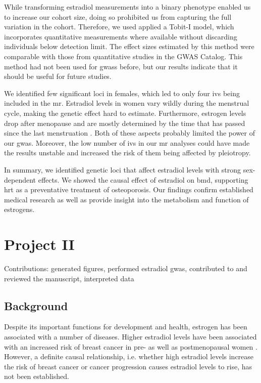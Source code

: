 \documentclass[twoside=false]{scrbook}
\begin{document}
While transforming estradiol measurements into a binary phenotype enabled us to increase our cohort size, doing so prohibited us from capturing the full variation in the cohort.
Therefore, we used applied a Tobit-I model, which incorporates quantitative measurements where available without discarding individuals below detection limit.
The effect sizes estimated by this method were comparable with those from quantitative studies in the GWAS Catalog.
This method had not been used for \glspl{gwas} before, but our results indicate that it should be useful for future studies.

We identified few significant loci in females, which led to only four \glspl{iv} being included in the \gls{mr}.
Estradiol levels in women vary wildly during the menstrual cycle, making the genetic effect hard to estimate.
Furthermore, estrogen levels drop after menopause and are mostly determined by the time that has passed since the last menstruation \cite{Richardson2020}.
Both of these aspects probably limited the power of our \gls{gwas}.
Moreover, the low number of \glspl{iv} in our \gls{mr} analyses could have made the results unstable and increased the risk of them being affected by pleiotropy.

In summary, we identified genetic loci that affect estradiol levels with strong sex-dependent effects.
We showed the causal effect of estradiol on \gls{bmd}, supporting \gls{hrt} as a preventative treatment of osteoporosis.
Our findings confirm established medical research as well as provide insight into the metabolism and function of estrogens.

\chapter{Project II}
{
    \parindent 0pt \color{gray}
    Contributions: generated figures, performed estradiol \gls{gwas}, contributed to and reviewed the manuscript, interpreted data
}

\section{Background}
Despite its important functions for development and health, estrogen has been associated with a number of diseases.
Higher estradiol levels have been associated with an increased risk of breast cancer in pre- as well as postmenopausal women \cite{Key2013,Kaaks2005,Zhang2013,Kaaks2005a}.
However, a definite causal relationship, i.e. whether high estradiol levels increase the risk of breast cancer or cancer progression causes estradiol levels to rise, has not been established.
\end{document}

